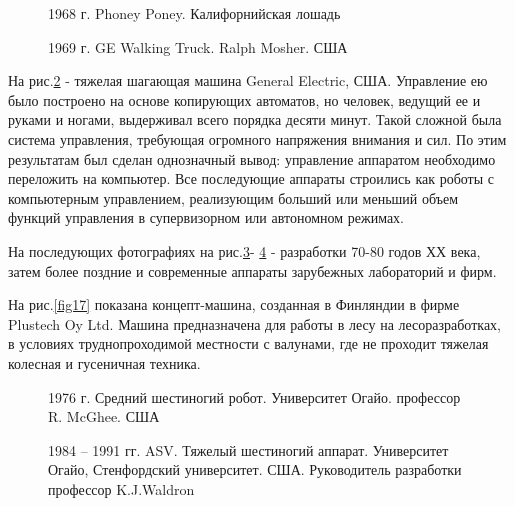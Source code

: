 \begin{figure}[h]
\caption{1968 г. Phoney Poney. Калифорнийская лошадь}
\label{fig13}
\end{figure}

\begin{figure}[h]
\caption{1969 г. GE Walking Truck. Ralph Mosher. США}
\label{fig14}
\end{figure}

На рис.\ref{fig14} - тяжелая шагающая машина General Electric, США. Управление ею было построено на основе копирующих автоматов, но человек, ведущий ее и руками и ногами, выдерживал всего порядка десяти минут. Такой сложной была система управления, требующая огромного напряжения внимания и сил. По этим результатам был сделан однозначный вывод: управление аппаратом необходимо переложить на компьютер. Все последующие аппараты строились как роботы с компьютерным управлением, реализующим больший или меньший объем функций управления в супервизорном или автономном режимах.

На последующих фотографиях на рис.\ref{fig15}- \ref{fig16} - разработки 70-80 годов ХХ века, затем более поздние и современные аппараты зарубежных лабораторий и фирм.

На рис.\ref{fig17} показана концепт-машина, созданная в Финляндии в фирме Plustech Oy Ltd. Машина предназначена для работы в лесу на лесоразработках, в условиях труднопроходимой местности с валунами, где не проходит тяжелая колесная и гусеничная техника.

\begin{figure}
\caption{1976 г. Средний шестиногий робот. Университет Огайо. 
профессор R. McGhee. США}
\label{fig15}
\end{figure}

\begin{figure}
\begin{minipage}{0.49\linewidth}
\end{minipage}
\hfill
\begin{minipage}{0.49\linewidth}
\end{minipage}
\caption{1984 – 1991 гг. ASV. Тяжелый шестиногий аппарат. 
Университет Огайо, Стенфордский университет. США.
Руководитель разработки профессор K.J.Waldron}
\label{fig16}
\end{figure}



